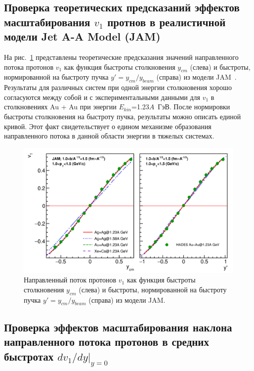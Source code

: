 \subsection{Проверка теоретических предсказаний эффектов масштабирования $v_1$ протнов в реалистичной модели Jet A-A Model (JAM)}

На рис.~\ref{fig:hades_model_ycm_scaling} представлены теоретические предсказания значений направленного потока протонов $v_1$ как функция быстроты столкновения $y_{cm}$ (слева) и быстроты, нормированной на быстроту пучка $y'=y_{cm}/y_{beam}$ (справа) из модели JAM~\cite{Mamaev:2024-2}.
Результаты для различных систем при одной энергии столкновения хорошо согласуются между собой и с экспериментальными данными для $v_1$ в столкновениях Au + Au при энергии $E_{kin}$=1.23$A$~ГэВ.
После нормировки быстроты столкновения на быстроту пучка, результаты можно описать единой кривой.
Этот факт свидетельствует о едином механизме образования направленного потока в данной области энергии в тяжелых системах.
%
\begin{figure}[ht]
\begin{center}
\includegraphics[width=0.95\linewidth]{images/v1_hades_model_ycm_scaling.png}
\caption{Направленный поток протонов $v_1$ как функция быстроты столкновения $y_{cm}$ (слева) и быстроты, нормированной на быстроту пучка $y'=y_{cm}/y_{beam}$ (справа) из модели JAM.}
\label{fig:hades_model_ycm_scaling}
\end{center}
\end{figure}

\subsection{Проверка эффектов масштабирования наклона направленного потока протонов в средних быстротах $dv_1/dy|_{y=0}$}

